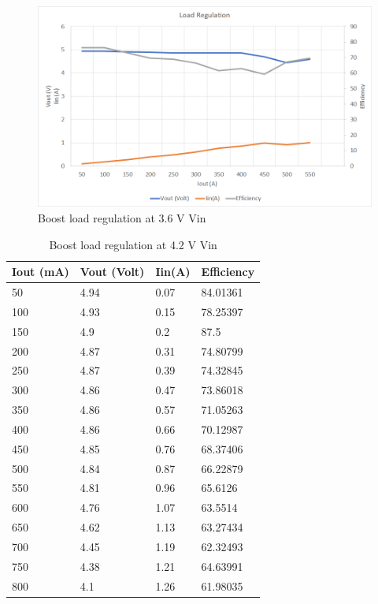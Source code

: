\begin{figure}[H]
	\centering
	\includegraphics[width=\columnwidth]{IMGS/Boost load regulation at 3.6V Vin.png}
	\caption{Boost load regulation at 3.6 V Vin}
	\label{fig:arch}
\end{figure}
\begin{table}[H]
\centering
\begin{tabular}{|l|l|l|l|}
\hline
Iout (mA) & Vout (Volt) & Iin(A) & Efficiency \\ \hline
50        & 4.94        & 0.07   & 84.01361   \\ \hline
100       & 4.93        & 0.15   & 78.25397   \\ \hline
150       & 4.9         & 0.2    & 87.5       \\ \hline
200       & 4.87        & 0.31   & 74.80799   \\ \hline
250       & 4.87        & 0.39   & 74.32845   \\ \hline
300       & 4.86        & 0.47   & 73.86018   \\ \hline
350       & 4.86        & 0.57   & 71.05263   \\ \hline
400       & 4.86        & 0.66   & 70.12987   \\ \hline
450       & 4.85        & 0.76   & 68.37406   \\ \hline
500       & 4.84        & 0.87   & 66.22879   \\ \hline
550       & 4.81        & 0.96   & 65.6126    \\ \hline
600       & 4.76        & 1.07   & 63.5514    \\ \hline
650       & 4.62        & 1.13   & 63.27434   \\ \hline
700       & 4.45        & 1.19   & 62.32493   \\ \hline
750       & 4.38        & 1.21   & 64.63991   \\ \hline
800       & 4.1         & 1.26   & 61.98035   \\ \hline
\end{tabular}
\caption{Boost load regulation at 4.2 V Vin}
\label{table:4}
\end{table}
